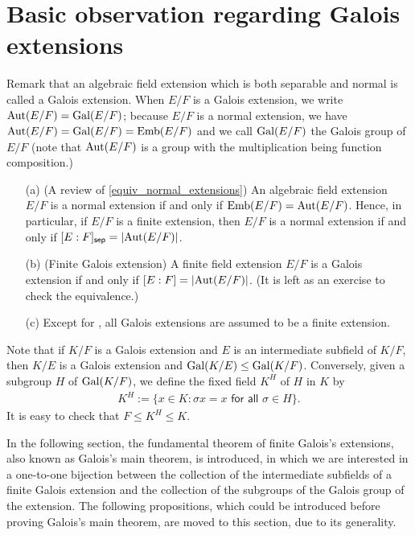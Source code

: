 \section{Basic observation regarding Galois extensions}

Remark that an algebraic field extension which is both separable and normal is called a Galois extension.
When $E/F$ is a Galois extension, we write ${\textrm{Aut}({E/F})}={\textrm{Gal}({E/F})}$; because $E/F$ is a normal extension, we have ${\textrm{Aut}({E/F})}={\textrm{Gal}({E/F})}={\textrm{Emb}({E/F})}$ and we call ${\textrm{Gal}({E/F})}$ the Galois group of $E/F$ (note that ${\textrm{Aut}({E/F})}$ is a group with the multiplication being function composition.)
\begin{rmk}
    \begin{enumerate}
        \item[(a)]
        {
            (A review of \cref{equiv_normal_extensions})
            An algebraic field extension $E/F$ is a normal extension if and only if ${\textrm{Emb}({E/F})}={\textrm{Aut}({E/F})}$.
            Hence, in particular, if $E/F$ is a finite extension, then $E/F$ is a normal extension if and only if $[E:F]_{\textsf{sep}}=|{\textrm{Aut}({E/F})}|$.
        }
        \item[(b)]
        {
            (Finite Galois extension)
            A finite field extension $E/F$ is a Galois extension if and only if $[E:F]=|{\textrm{Aut}({E/F})}|$.
            \color{brown}(It is left as an exercise to check the equivalence.)\color{black}
        }
        \item[(c)]
        {
            Except for , all Galois extensions are assumed to be a finite extension.
        }
    \end{enumerate}
\end{rmk}

Note that if $K/F$ is a Galois extension and $E$ is an intermediate subfield of $K/F$, then $K/E$ is a Galois extension and ${\textrm{Gal}({K/E})}\leq{\textrm{Gal}({K/F})}$.
Conversely, given a subgroup $H$ of ${\textrm{Gal}({K/F})}$, we define the fixed field $K^H$ of $H$ in $K$ by
\begin{align*}
    K^H:=\{x\in K: \textsf{$\sigma x=x$ for all $\sigma\in H$}\}.
\end{align*}
It is easy to check that $F\leq K^H\leq K$.

In the following section, the fundamental theorem of finite Galois's extensions, also known as Galois's main theorem, is introduced, in which we are interested in a one-to-one bijection between the collection of the intermediate subfields of a finite Galois extension and the collection of the subgroups of the Galois group of the extension.
The following propositions, which could be introduced before proving Galois's main theorem, are moved to this section, due to its generality.

